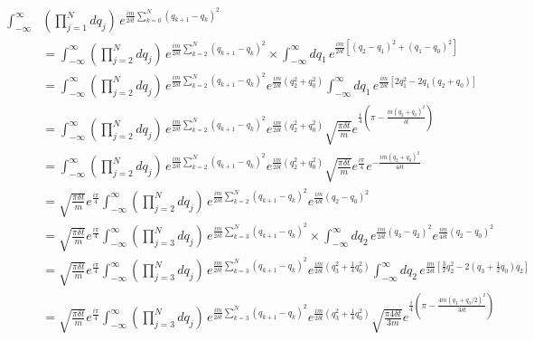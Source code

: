 \documentclass[10pt,a4paper]{article}
\theoremstyle{definition}
\begin{document}
\begin{align}
    \int_{-\infty}^{\infty}&\left(\prod_{j=1}^N dq_j\right)\,e^{\frac{im}{2\delta t}\sum_{k=0}^N(q_{k+1}-q_k)^2}\\
    &=\int_{-\infty}^{\infty}\left(\prod_{j=2}^N dq_j\right)\,e^{\frac{im}{2\delta t}\sum_{k=2}^N(q_{k+1}-q_k)^2}
    \times\int_{-\infty}^{\infty}dq_1\,e^{\frac{im}{2\delta t}\left[(q_2-q_1)^2+(q_1-q_0)^2\right]}\\
    &=\int_{-\infty}^{\infty}\left(\prod_{j=2}^N dq_j\right)\,e^{\frac{im}{2\delta t}\sum_{k=2}^N(q_{k+1}-q_k)^2}
    e^{\frac{im}{2\delta t}(q_2^2+q_0^2)}\int_{-\infty}^{\infty}dq_1\,e^{\frac{im}{2\delta t}[2q_1^2-2q_1(q_2+q_0)]}\\
    &=\int_{-\infty}^{\infty}\left(\prod_{j=2}^N dq_j\right)\,e^{\frac{im}{2\delta t}\sum_{k=2}^N(q_{k+1}-q_k)^2}
    e^{\frac{im}{2\delta t}(q_2^2+q_0^2)}\sqrt{\frac{\pi\delta t}{m}}e^{\frac{i}{4}\left(\pi-\frac{m(q_2+q_0)^2}{\delta t}\right)}\\
    &=\int_{-\infty}^{\infty}\left(\prod_{j=2}^N dq_j\right)\,e^{\frac{im}{2\delta t}\sum_{k=2}^N(q_{k+1}-q_k)^2}
    e^{\frac{im}{2\delta t}(q_2^2+q_0^2)}\sqrt{\frac{\pi\delta t}{m}}e^{\frac{i\pi}{4}}e^{-\frac{im(q_2+q_0)^2}{4\delta t}}\\
    &=\sqrt{\frac{\pi\delta t}{m}}e^{\frac{i\pi}{4}}\int_{-\infty}^{\infty}\left(\prod_{j=2}^N dq_j\right)\,e^{\frac{im}{2\delta t}\sum_{k=2}^N(q_{k+1}-q_k)^2}
    e^{\frac{im}{4\delta t}(q_2-q_0)^2}\\
    &=\sqrt{\frac{\pi\delta t}{m}}e^{\frac{i\pi}{4}}\int_{-\infty}^{\infty}\left(\prod_{j=3}^N dq_j\right)\,e^{\frac{im}{2\delta t}\sum_{k=3}^N(q_{k+1}-q_k)^2}\times\int_{-\infty}^\infty dq_2\,e^{\frac{im}{2\delta t}(q_3-q_2)^2}
    e^{\frac{im}{4\delta t}(q_2-q_0)^2}\\
    &=\sqrt{\frac{\pi\delta t}{m}}e^{\frac{i\pi}{4}}\int_{-\infty}^{\infty}\left(\prod_{j=3}^N dq_j\right)\,e^{\frac{im}{2\delta t}\sum_{k=3}^N(q_{k+1}-q_k)^2}e^{\frac{im}{2\delta t}(q_3^2+\frac{1}{4}q_0^2)}\int_{-\infty}^\infty dq_2\,e^{\frac{im}{2\delta t}[\frac{3}{2}q_2^2-2(q_3+\frac{1}{2}q_0)q_2]}\\
    &=\sqrt{\frac{\pi\delta t}{m}}e^{\frac{i\pi}{4}}\int_{-\infty}^{\infty}\left(\prod_{j=3}^N dq_j\right)\,e^{\frac{im}{2\delta t}\sum_{k=3}^N(q_{k+1}-q_k)^2}e^{\frac{im}{2\delta t}(q_3^2+\frac{1}{4}q_0^2)}\sqrt{\frac{\pi4\delta t}{3m}}e^{\frac{i}{4}\left(\pi-\frac{4m(q_3+q_0/2)^2}{3\delta t}\right)}\\
\end{align}
\end{document}
